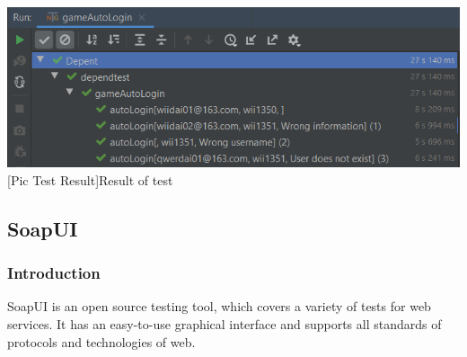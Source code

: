 \documentclass[12pt,a4paper,bibliography=totocnumbered,listof=totocnumbered]{article}
\begin{document}
	\begin{minipage}{\linewidth}
		\centering
		\includegraphics[width=0.5\linewidth]{pics/login05.png}
		[Pic Test Result]{Result of test}
		\label{fig:login02}
	\end{minipage} 

\subsection{SoapUI}
\subsubsection{Introduction}
SoapUI is an open source testing tool, which covers a variety of tests for web services. 
It has an easy-to-use graphical interface and supports all standards of protocols and technologies of web.
\end{document}
